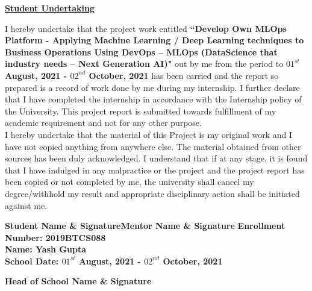 \documentclass[12pt,oneside,a4paper]{report}
\begin{document}
\newpage
\begin{large}
\begin{center}
\fontsize{16pt}{10pt}\selectfont
\Large{\underline{\textbf{Student Undertaking}}}
\end{center}
\end{large}
\doublespacing
I hereby undertake that the project work entitled \textbf{ “Develop Own MLOps Platform - Applying Machine Learning / Deep Learning techniques to Business Operations Using DevOps – MLOps (DataScience that industry needs
– Next Generation AI)"} out by me from the period to \textbf{$01^{st}$ August, 2021 - $02^{nd}$ October, 2021} has been carried and the report so prepared is a record of work done by me during my internship. I further declare that I have completed the internship in accordance with the Internship policy of the University. This project report is submitted towards fulfillment of my academic requirement and not for any other purpose.\vspace{5.0mm}\\I hereby undertake that the material of this Project is my original work and I have not copied anything from anywhere else. The material obtained from other sources has been duly acknowledged. I understand that if at any stage, it is found that I have indulged in any malpractice or the project and the project report has been copied or not completed by me, the university shall cancel my degree/withhold my result and appropriate disciplinary action shall be initiated against me.
\doublespacing

\begin{flushleft}
\vspace{1.0in}\textbf{Student Name \& Signature}\hspace{2.8in}\textbf{Mentor Name \& Signature}
\hspace{3.0in}\textbf{Enrollment Number: 2019BTCS088\\Name: Yash Gupta\\School Date: \textbf{$01^{st}$ August, 2021 - $02^{nd}$ October, 2021}}\vspace{20mm}
\begin{flushright}
\textbf{ Head of School Name \& Signature}
\end{flushright}
\end{flushleft}
\end{document}
